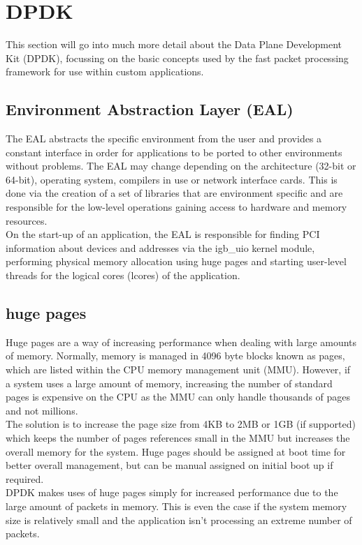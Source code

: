 \documentclass[final_report.tex]{subfiles}
\begin{document}
\section{DPDK}
This section will go into much more detail about the Data Plane Development Kit (DPDK), focussing on the basic concepts used by the fast packet processing framework for use within custom applications.

\subsection{Environment Abstraction Layer (EAL)}
The EAL abstracts the specific environment from the user and provides a constant interface in order for applications to be ported to other environments without problems. The EAL may change depending on the architecture (32-bit or 64-bit), operating system, compilers in use or network interface cards. This is done via the creation of a set of libraries that are environment specific and are responsible for the low-level operations gaining access to hardware and memory resources. \\
\newline
On the start-up of an application, the EAL is responsible for finding PCI information about devices and addresses via the igb\_uio kernel module, performing physical memory allocation using huge pages  and starting user-level threads for the logical cores (lcores) of the application. 

\subsection{huge pages}
Huge pages are a way of increasing performance when dealing with large amounts of memory. Normally, memory is managed in 4096 byte blocks known as pages, which are listed within the CPU memory management unit (MMU). However, if a system uses a large amount of memory, increasing the number of standard pages is expensive on the CPU as the MMU can only handle thousands of pages and not millions. \\
\newline
The solution is to increase the page size from 4KB to 2MB or 1GB (if supported) which keeps the number of pages references small in the MMU but increases the overall memory for the system. Huge pages should be assigned at boot time for better overall management, but can be manual assigned on initial boot up if required. \\
\newline
DPDK makes uses of huge pages simply for increased performance due to the large amount of packets in memory. This is even the case if the system memory size is relatively small and the application isn't processing an extreme number of packets.
\end{document}
